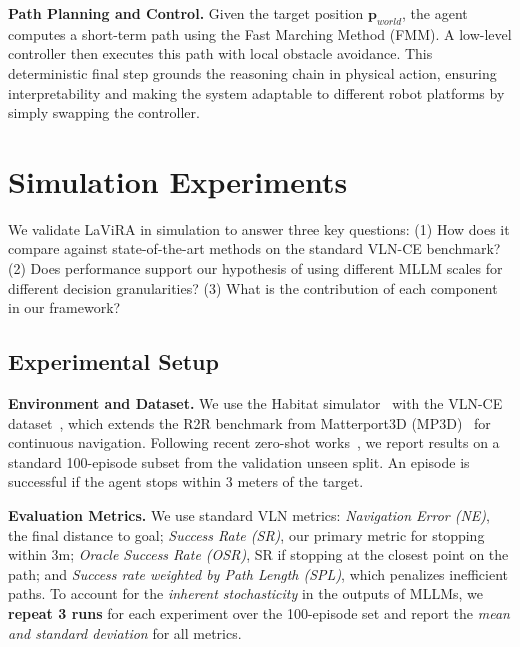 \documentclass[letterpaper, 10 pt, conference]{ieeeconf}
\begin{document}
\noindent\textbf{Path Planning and Control.}
Given the target position $\mathbf{p}_{world}$, the agent computes a short-term path using the Fast Marching Method (FMM). A low-level controller then executes this path with local obstacle avoidance. This deterministic final step grounds the reasoning chain in physical action, ensuring interpretability and making the system adaptable to different robot platforms by simply swapping the controller.



\section{Simulation Experiments}
\label{sec:experiments}

We validate LaViRA in simulation to answer three key questions: (1) How does it compare against state-of-the-art methods on the standard VLN-CE benchmark? (2) Does performance support our hypothesis of using different MLLM scales for different decision granularities? (3) What is the contribution of each component in our framework?

\subsection{Experimental Setup}
\noindent\textbf{Environment and Dataset.}
We use the Habitat simulator~\cite{savva2019habitat} with the VLN-CE dataset~\cite{krantz_vlnce_2020}, which extends the R2R benchmark from Matterport3D (MP3D)~\cite{chang2017matterport3d} for continuous navigation. Following recent zero-shot works~\cite{qiao2024opennav, shi2025smartway}, we report results on a standard 100-episode subset from the validation unseen split. An episode is successful if the agent stops within 3 meters of the target.

\noindent\textbf{Evaluation Metrics.}
We use standard VLN metrics: \textit{Navigation Error (NE)}, the final distance to goal; \textit{Success Rate (SR)}, our primary metric for stopping within 3m; \textit{Oracle Success Rate (OSR)}, SR if stopping at the closest point on the path; and \textit{Success rate weighted by Path Length (SPL)}, which penalizes inefficient paths. 
To account for the \textit{inherent stochasticity} in the outputs of MLLMs, we  \textbf{repeat 3 runs} for each experiment over the 100-episode set and report the \textit{mean and standard deviation} for all metrics.
\end{document}
